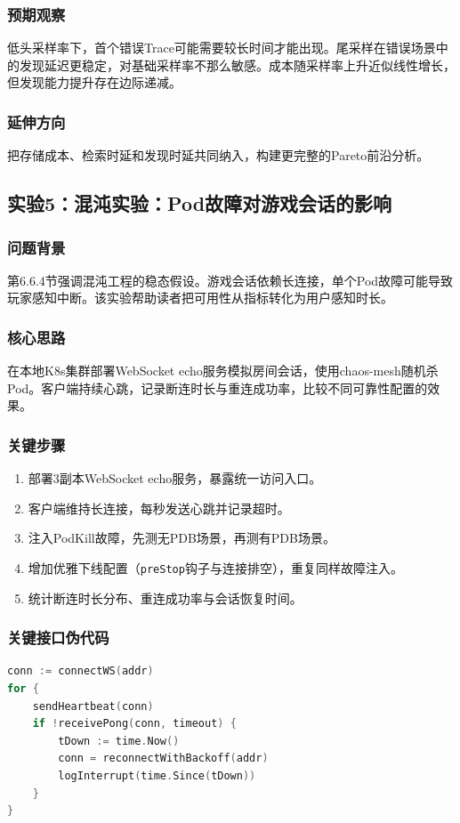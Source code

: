 \subsubsection{预期观察}
低头采样率下，首个错误Trace可能需要较长时间才能出现。尾采样在错误场景中的发现延迟更稳定，对基础采样率不那么敏感。成本随采样率上升近似线性增长，但发现能力提升存在边际递减。

\subsubsection{延伸方向}
把存储成本、检索时延和发现时延共同纳入，构建更完整的Pareto前沿分析。

\subsection{实验5：混沌实验：Pod故障对游戏会话的影响}

\subsubsection{问题背景}
第6.6.4节强调混沌工程的稳态假设。游戏会话依赖长连接，单个Pod故障可能导致玩家感知中断。该实验帮助读者把可用性从指标转化为用户感知时长。

\subsubsection{核心思路}
在本地K8s集群部署WebSocket echo服务模拟房间会话，使用chaos-mesh随机杀Pod。客户端持续心跳，记录断连时长与重连成功率，比较不同可靠性配置的效果。

\subsubsection{关键步骤}
\begin{enumerate}
\item 部署3副本WebSocket echo服务，暴露统一访问入口。
\item 客户端维持长连接，每秒发送心跳并记录超时。
\item 注入PodKill故障，先测无PDB场景，再测有PDB场景。
\item 增加优雅下线配置（\texttt{preStop}钩子与连接排空），重复同样故障注入。
\item 统计断连时长分布、重连成功率与会话恢复时间。
\end{enumerate}

\subsubsection{关键接口伪代码}
\begin{tcolorbox}[title=混沌实验客户端心跳检测]
\begin{lstlisting}[style=codeblock, language=go]
conn := connectWS(addr)
for {
    sendHeartbeat(conn)
    if !receivePong(conn, timeout) {
        tDown := time.Now()
        conn = reconnectWithBackoff(addr)
        logInterrupt(time.Since(tDown))
    }
}
\end{lstlisting}
\end{tcolorbox}

